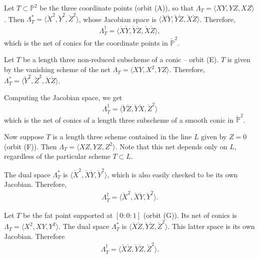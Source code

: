 \documentclass{article}
\renewcommand{\P}{\mathbb{P}}
\begin{document}
\begin{example}
  \label{example:coordinatepoints}
  Let $T \subset \P^{2}$ be the three coordinate points (orbit (A)), so that
  $\Lambda_{T} = \langle XY, YZ, XZ \rangle $. Then
  $\Lambda_{T}^{*} = \langle \check{X}^{2}, \check{Y}^{2}, \check{Z}^{2} \rangle $, whose
  Jacobian space is $\langle \check{X}\check{Y}, \check{Y}\check{Z}, \check{X}\check{Z} \rangle
  $.   Therefore,
  \begin{eqnarray*}
    \Lambda_{T}^{\dagger} = \langle \check{X}\check{Y}, \check{Y}\check{Z}, \check{X}\check{Z} \rangle, 
  \end{eqnarray*}
  which is the net of conics for the coordinate points in $\check{\P}^{2}$.
\end{example}

\begin{example}
    \label{example:curvillinearconic} Let $T$ be a length three non-reduced subscheme of a conic -- orbit (E).  $T$ is given by the vanishing scheme of the net $\Lambda_{T} = \langle XY, X^{2}, YZ \rangle$. Therefore, $\Lambda^{*}_{T} = \langle \check{Y}^{2}, \check{Z}^{2}, \check{X}\check{Z} \rangle$.  

    Computing the Jacobian space, we get $$\Lambda_{T}^{\dagger} = \langle \check{Y}\check{Z}, \check{Y}\check{X}, \check{Z}^{2} \rangle$$ which is the net of conics of a length three subscheme of a smooth conic in $\check{\P}^{2}$. 
\end{example}


\begin{example}
    \label{example:collinearZnet}
    Now suppose $T$ is a length three scheme contained in the line
    $L$ given by $Z=0$ (orbit (F)).  Then
    $\Lambda_{T} = \langle XZ, YZ, Z^{2} \rangle$.  Note that this net depends only on $L$, regardless of the particular
    scheme $T \subset L$.
  
    The dual space $\Lambda_{T}^{*}$ is
    $\langle \check{X}^{2},\check{X}\check{Y}, \check{Y}^{2} \rangle$, which is also easily checked to
    be its own Jacobian. Therefore,
    \begin{eqnarray*}
      \Lambda_{T}^{\dagger} = \langle \check{X}^{2}, \check{X}\check{Y}, \check{Y}^{2} \rangle.
    \end{eqnarray*}
    
  \end{example}

\begin{example}
  \label{example:fatpointZnet}
  Let $T$ be the fat point supported at $[0:0:1]$ (orbit (G)).  Its net of
  conics is $\Lambda_{T} = \langle X^{2}, XY, Y^{2}\rangle$. The dual
  space $\Lambda_{T}^{*}$ is $\langle \check{X}\check{Z}, \check{Y}\check{Z}, \check{Z}^{2} \rangle$. This
  latter space is its own Jacobian. Therefore
  \begin{eqnarray*}
    \Lambda_{T}^{\dagger} = \langle \check{X}\check{Z}, \check{Y}\check{Z}, \check{Z}^{2} \rangle.
  \end{eqnarray*}
  
\end{example}
\end{document}
